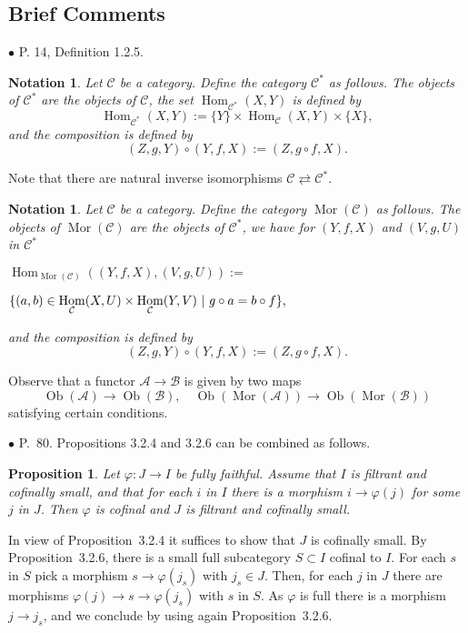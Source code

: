 \documentclass[12pt]{article}
\newtheorem{prop}[thm]{Proposition}
\newtheorem{nota}[thm]{Notation}
\theoremstyle{remark}%
\newcommand{\bu}{\bullet}
\newcommand{\n}{\noindent}
\newcommand{\A}{\mathcal A}
\newcommand{\B}{\mathcal B}
\newcommand{\C}{\mathcal C}
\newcommand{\p}{\varphi}
\newcommand{\pr}{Proposition}
\DeclareMathOperator{\h}{Hom}
\DeclareMathOperator{\Mor}{Mor}
\DeclareMathOperator{\Ob}{Ob}
\begin{document}
\subsection{Brief Comments} %
%
\n$\bu$ P. 14, Definition 1.2.5.
%
\begin{nota}\label{c*}
%
Let $\C$ be a category. Define the category $\C^*$ as follows. The objects of $\C^*$ are the objects of $\C$, the set $\h_{\C^*}(X,Y)$ is defined by  
$$
\h_{\C^*}(X,Y):=\{Y\}\times\h_{\C}(X,Y)\times\{X\},
$$
and the composition is defined by 
$$
(Z,g,Y)\circ(Y,f,X):=(Z,g\circ f,X).
$$ 
%
\end{nota}
%
Note that there are natural inverse isomorphisms $\C\rightleftarrows\C^*$. 
%
\begin{nota}\label{mor}
%
Let $\C$ be a category. Define the category $\Mor(\C)$ as follows. The objects of $\Mor(\C)$ are the objects of $\C^*$, we have for $(Y,f,X)$ and $(V,g,U)$ in $\C^*$\bigskip 

\n$\displaystyle \h_{\Mor(\C)}((Y,f,X),(V,g,U)):=$\bigskip 

$\hfill\displaystyle\{(a,b)\in\h_\C(X,U)\times\h_\C(Y,V)\ | \ g\circ a=b\circ f\},$\bigskip 

\n and the composition is defined by 
$$
(Z,g,Y)\circ(Y,f,X):=(Z,g\circ f,X).
$$
%
\end{nota}
%
Observe that a functor $\A\to\B$ is given by two maps 
$$
\Ob(\A)\to\Ob(\B),\quad\Ob(\Mor(\A))\to\Ob(\Mor(\B))
$$ 
satisfying certain conditions. 


\n$\bu$ P.~80. \pr s 3.2.4 and 3.2.6 can be combined as follows. 

\begin{prop}\label{comb} 
Let $\p:J\to I$ be fully faithful. Assume that $I$ is filtrant and cofinally small, and that for each $i$ in $I$ there is a morphism $i\to\p(j)$ for some $j$ in $J$. Then $\p$ is cofinal and $J$ is filtrant and cofinally small. 
\end{prop} 

\n{\em Proof.} In view of \pr\ 3.2.4 it suffices to show that $J$ is cofinally small. By \pr\ 3.2.6, there is a small full subcategory $S\subset I$ cofinal to $I$. For each $s$ in $S$ pick a morphism $s\to\p(j_s)$ with $j_s\in J$. Then, for each $j$ in $J$ there are morphisms $\p(j)\to s\to\p(j_s)$ with $s$ in $S$. As $\p$ is full there is a morphism $j\to j_s$, and we conclude by using again \pr\ 3.2.6. 

\end{document}
